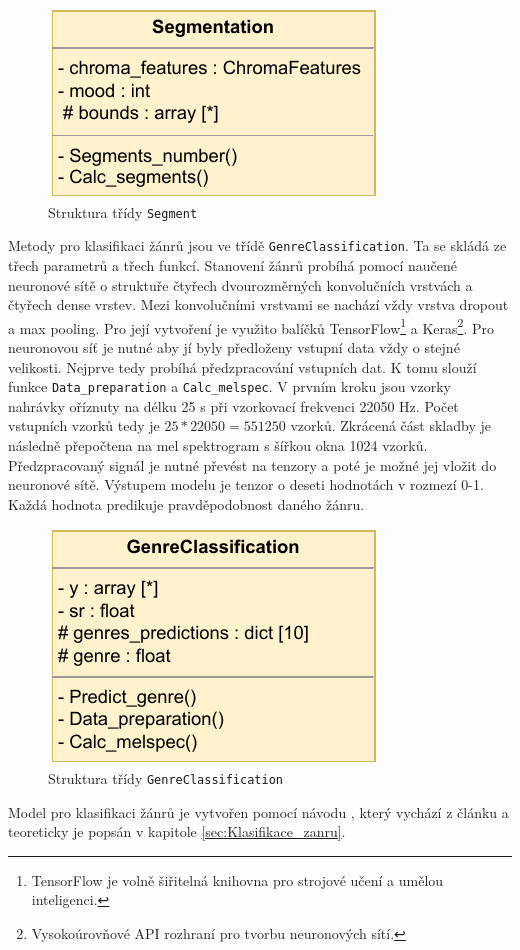 \begin{figure}[H]
    \centering
    \includegraphics[width = 0.3\linewidth]{obrazky/UML_diagram_Segmentation.pdf}
    \caption{Struktura třídy \texttt{Segment}}
    \label{fig:Segmentation_diagram}
\end{figure}

Metody pro klasifikaci žánrů jsou ve třídě \texttt{GenreClassification}. Ta se skládá ze třech parametrů a třech funkcí. Stanovení žánrů probíhá pomocí naučené neuronové sítě o struktuře čtyřech dvourozměrných konvolučních vrstvách a čtyřech dense vrstev. Mezi konvolučními vrstvami se nachází vždy vrstva dropout a max pooling. Pro její vytvoření je využito balíčků TensorFlow\footnote{TensorFlow je volně šiřitelná knihovna pro strojové učení a umělou inteligenci.} a Keras\footnote{Vysokoúrovňové API rozhraní pro tvorbu neuronových sítí.}. Pro neuronovou síť je nutné aby jí byly předloženy vstupní data vždy o stejné velikosti. Nejprve tedy probíhá předzpracování vstupních dat. K tomu slouží funkce \texttt{Data\_preparation} a \texttt{Calc\_melspec}. V prvním kroku jsou vzorky nahrávky oříznuty na délku 25 s při vzorkovací frekvenci 22050 Hz. Počet vstupních vzorků tedy je $25 * 22050 = 551250$ vzorků. Zkrácená část skladby je následně přepočtena na mel spektrogram s šířkou okna 1024 vzorků. Předzpracovaný signál je nutné převést na tenzory a poté je možné jej vložit do neuronové sítě. Výstupem modelu je tenzor o deseti hodnotách v rozmezí 0-1. Každá hodnota predikuje pravděpodobnost daného žánru. 

\begin{figure}[H]
    \centering
    \includegraphics[width = 0.3\linewidth]{obrazky/UML_diagramy_GenreClassification.pdf}
    \caption{Struktura třídy \texttt{GenreClassification}}
    \label{fig:GenreClassification_diagram}
\end{figure}

Model pro klasifikaci žánrů je vytvořen pomocí návodu  \cite{Music_classification_using_deep_learning}, který vychází z článku \cite{Music_genre_classification_paper} a teoreticky je popsán v kapitole \ref{sec:Klasifikace_zanru}. 

